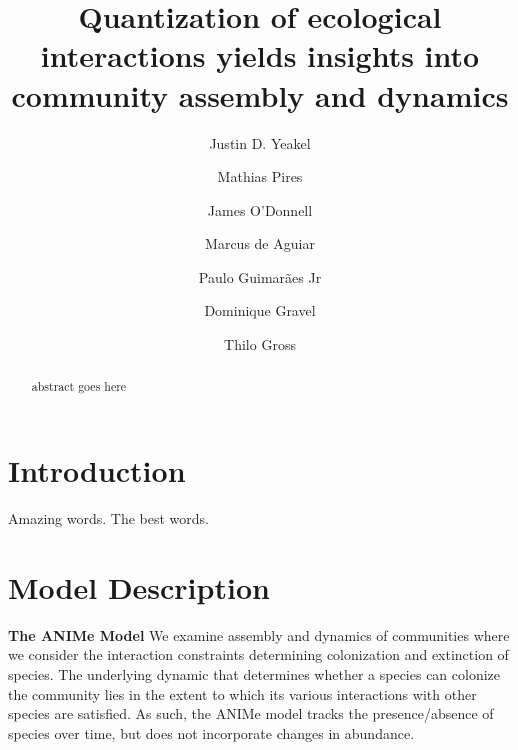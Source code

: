 \documentclass[twocolumn,preprintnumbers,amsmath,amssymb,superscriptaddress]{revtex4}
\begin{document}
\author{Justin D. Yeakel} 

\author{Mathias Pires} \affiliation{}

\author{James O'Donnell} \affiliation{}

\author{Marcus de Aguiar} \affiliation{}

\author{Paulo Guimar\~aes Jr} \affiliation{}

\author{Dominique Gravel} \affiliation{}

\author{Thilo Gross} \affiliation{}

\title{Quantization of ecological interactions yields insights into community assembly and dynamics}


\begin{abstract}
abstract goes here
\end{abstract}

\maketitle

\section*{Introduction}

Amazing words. The best words.



\section*{Model Description}

{\bf The ANIMe Model} 
We examine assembly and dynamics of communities where we consider the interaction constraints determining colonization and extinction of species.
The underlying dynamic that determines whether a species can colonize the community lies in the extent to which its various interactions with other species are satisfied.
As such, the ANIMe model tracks the presence/absence of species over time, but does not incorporate changes in abundance.
\end{document}
